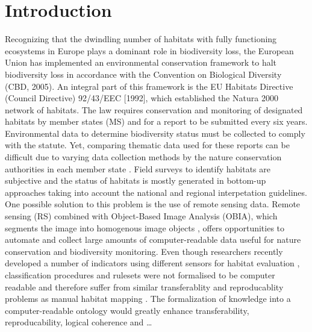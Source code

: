\documentclass[authoryear, review,12pt,number]{elsarticle}
\begin{document}
\section{Introduction} 
Recognizing that the dwindling number of habitats with fully functioning
ecosystems in Europe  plays a dominant role in biodiversity loss, the European
Union has implemented an environmental conservation framework to halt biodiversity loss in accordance
with the Convention on Biological Diversity (CBD, 2005). An integral part of this
framework is the EU Habitats Directive (Council Directive) 92/43/EEC [1992],
which established the Natura 2000 network of habitats. The law requires
conservation and monitoring of designated habitats by member states (MS) and for
a report to be submitted every six years. Environmental data 
to determine biodiversity status must be collected to comply with the 
statute. Yet, comparing thematic data used for these reports can be difficult
due to varying data collection methods by the nature conservation authorities
in each member state \citep{}.
Field surveys to identify habitats are subjective \citep{Cherrill1999,
Cherrill1999a, Nieland2015} %
and the status of habitats is mostly generated in bottom-up
approaches taking into account the national and regional interpetation
guidelines. \\%
One possible solution to this problem is the use of remote sensing data. 
Remote sensing (RS) combined with Object-Based Image Analysis (OBIA), which
segments the image into homogenous image objects \citep{Blaschke2010}, offers
opportunities to automate and collect large amounts of computer-readable data
useful for nature conservation \citep{Corbane2015, VandenBorre2011, Mayer2011}
and biodiversity monitoring. Even though researchers recently developed a
number of indicators using different sensors for habitat evaluation
\citep{Nagendra2013}, classification procedures and rulesets were not formalised
to be computer readable and therefore suffer from similar transferablity and
reproducablity problems as manual habitat mapping
\citep{Arvor2013} \citep{Nieland2015}.
The formalization of knowledge into a
computer-readable ontology would greatly enhance transferability,
reproducability, logical coherence and \ldots

\citep{diSciascio2013}
\end{document}
